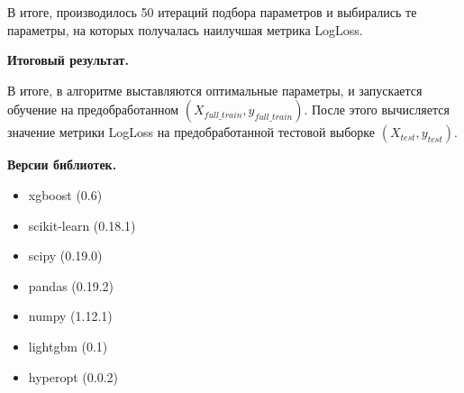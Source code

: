 \documentclass{article}
\begin{document}
В итоге, производилось 50 итераций подбора параметров и выбирались те параметры, на которых получалась наилучшая метрика LogLoss.


\medskip
\noindent\textbf{Итоговый результат.}
\medskip

В итоге, в алгоритме выставляются оптимальные параметры, и запускается обучение на предобработанном $(X_{full\_train}, y_{full\_train})$. После этого вычисляется значение метрики LogLoss на предобработанной тестовой выборке $(X_{test}, y_{test})$.

\medskip
\noindent\textbf{Версии библиотек.}

\begin{itemize}
  \item xgboost (0.6)
  \item scikit-learn (0.18.1)
  \item scipy (0.19.0)
  \item pandas (0.19.2)
  \item numpy (1.12.1)
  \item lightgbm (0.1)
  \item hyperopt (0.0.2)
\end{itemize}
\end{document}
